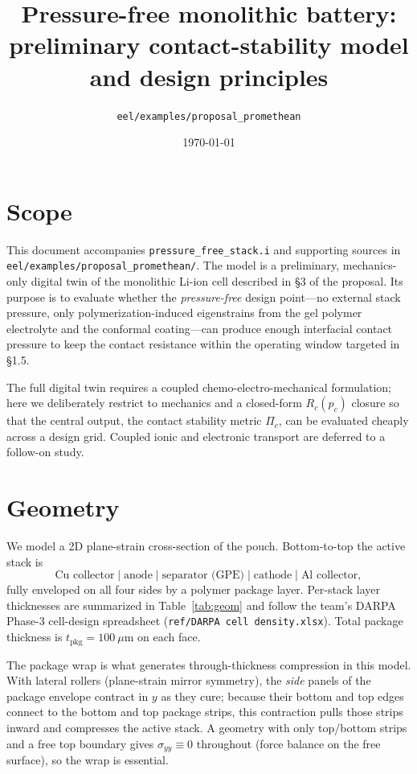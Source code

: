 \documentclass[11pt,letterpaper]{article}
\title{\textbf{Pressure-free monolithic battery: \\
preliminary contact-stability model and design principles}}
\author{\texttt{eel/examples/proposal\_promethean}}
\date{\today}
\begin{document}
\maketitle

\section{Scope}

This document accompanies \texttt{pressure\_free\_stack.i} and supporting
sources in \texttt{eel/examples/proposal\_promethean/}.  The model is a
preliminary, mechanics-only digital twin of the monolithic Li-ion cell
described in \S3 of the proposal.  Its purpose is to evaluate whether the
\emph{pressure-free} design point---no external stack pressure, only
polymerization-induced eigenstrains from the gel polymer electrolyte and
the conformal coating---can produce enough interfacial contact pressure
to keep the contact resistance within the operating window targeted in
\S1.5.

The full digital twin requires a coupled chemo-electro-mechanical
formulation; here we deliberately restrict to mechanics and a closed-form
$R_c(p_c)$ closure so that the central output, the contact stability
metric $\Pi_c$, can be evaluated cheaply across a design grid.  Coupled
ionic and electronic transport are deferred to a follow-on study.

\section{Geometry}

We model a 2D plane-strain cross-section of the pouch.  Bottom-to-top the
active stack is
\[
\text{Cu collector}\;|\;\text{anode}\;|\;\text{separator (GPE)}\;|\;\text{cathode}\;|\;\text{Al collector},
\]
fully enveloped on all four sides by a polymer package layer.
Per-stack layer thicknesses are summarized in Table~\ref{tab:geom} and
follow the team's DARPA Phase-3 cell-design spreadsheet
(\texttt{ref/DARPA cell density.xlsx}).  Total package thickness is
$t_{\text{pkg}} = 100~\mu$m on each face.

The package wrap is what generates through-thickness compression in this
model.  With lateral rollers (plane-strain mirror symmetry), the
\emph{side} panels of the package envelope contract in $y$ as they cure;
because their bottom and top edges connect to the bottom and top
package strips, this contraction pulls those strips inward and compresses
the active stack.  A geometry with only top/bottom strips and a free top
boundary gives $\sigma_{yy}\equiv 0$ throughout (force balance on the
free surface), so the wrap is essential.
\end{document}
